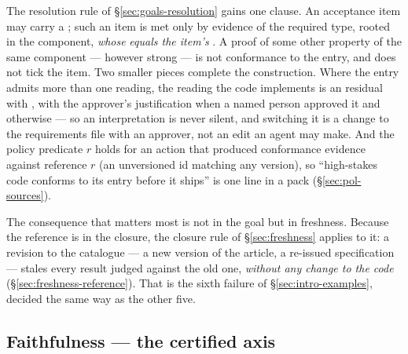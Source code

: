 The resolution rule of \S\ref{sec:goals-resolution} gains one clause. An acceptance item may carry a
; such an item is met only by evidence of the required type, rooted in the component,
\emph{whose}  \emph{equals the item's} . A proof of some other
property of the same component --- however strong --- is not conformance to the entry, and does not tick
the item. Two smaller pieces complete the construction. Where the entry admits more than one reading, the
reading the code implements is an  residual with , 
with the approver's justification when a named person approved it and  otherwise --- so an
interpretation is never silent, and switching it is a change to the requirements file with an approver,
not an edit an agent may make. And the policy predicate $r$\code{)} holds for an action
that produced conformance evidence against reference $r$ (an unversioned id matching any version), so
``high-stakes code conforms to its entry before it ships'' is one line in a pack
(\S\ref{sec:pol-sources}).

The consequence that matters most is not in the goal but in freshness. Because the reference is in the
closure, the closure rule of \S\ref{sec:freshness} applies to it: a revision to the catalogue --- a new
version of the article, a re-issued specification --- stales every result judged against the old one,
\emph{without any change to the code} (\S\ref{sec:freshness-reference}). That is the sixth failure of
\S\ref{sec:intro-examples}, decided the same way as the other five.

\subsection{Faithfulness --- the certified axis}\label{sec:goals-certified}

